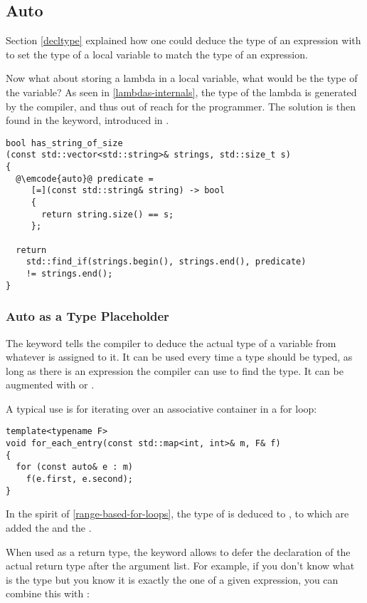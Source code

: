 \subsection{Auto}
\label{auto}

Section \ref{decltype} explained how one could deduce the type of an
expression with  to set the type of a local variable
to match the type of an expression.

Now what about storing a lambda in a local variable, what would be the
type of the variable? As seen in \ref{lambdas-internals}, the type of
the lambda is generated by the compiler, and thus out of reach for the
programmer. The solution is then found in the  keyword,
introduced in .

\begin{lstlisting}
bool has_string_of_size
(const std::vector<std::string>& strings, std::size_t s)
{
  @\emcode{auto}@ predicate =
     [=](const std::string& string) -> bool
     {
       return string.size() == s;
     };

  return
    std::find_if(strings.begin(), strings.end(), predicate)
    != strings.end();
}
\end{lstlisting}

\subsubsection{Auto as a Type Placeholder}

The  keyword tells the compiler to deduce the actual type
of a variable from whatever is assigned to it. It can be used every
time a type should be typed, as long as there is an expression the
compiler can use to find the type. It can be augmented with
 or \code{\&}.

A typical use is for iterating over an associative container in a for
loop:

\begin{lstlisting}
template<typename F>
void for_each_entry(const std::map<int, int>& m, F& f)
{
  for (const auto& e : m)
    f(e.first, e.second);
}
\end{lstlisting}

In the spirit of \ref{range-based-for-loops}, the type of  is
deduced to , to which are added the 
and the \code{\&}.

When used as a return type, the  keyword allows to defer
the declaration of the actual return type after the argument list. For
example, if you don't know what is the type but you know it is exactly
the one of a given expression, you can combine this with
:

